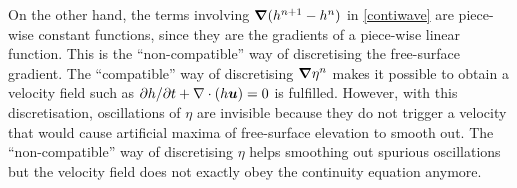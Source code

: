 On the other hand, the terms involving $\bm{\nabla}(h^{n+1}-h^{n})$ in
\eqref{contiwave} are
piece-wise constant functions, since they are the gradients of a piece-wise
linear function. This is the ``non-compatible'' way of discretising the
free-surface gradient.
The ``compatible'' way of discretising $\bm{\nabla}\eta^n$
makes it possible to obtain a velocity field such as
\mbox{$\partial h/\partial t+\nabla \cdot(h\bm{u})=0$} is fulfilled.
However, with this discretisation, oscillations of $\eta$ are invisible
because they do not trigger a velocity that would
cause artificial maxima of free-surface elevation to smooth out.
The ``non-compatible'' way of discretising $\eta$ helps
smoothing out spurious oscillations but the velocity field
does not exactly obey the continuity equation anymore.\\

